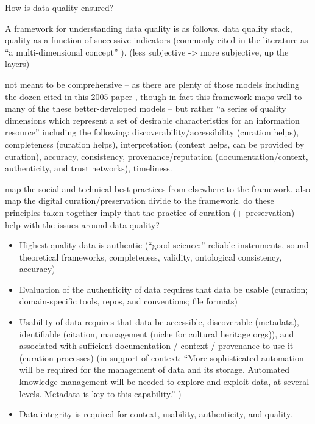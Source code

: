 \documentclass{acm_proc_article-sp}
\begin{document}
How is data quality ensured?

A framework for understanding data quality is as follows.  data
quality stack, quality as a function of successive indicators
(commonly cited in the literature as ``a multi-dimensional concept''
\cite{knight:quality}). (less subjective -> more subjective, up the
layers)

not meant to be comprehensive -- as there are plenty of those models
including the dozen cited in this 2005 paper \cite{knight:quality},
though in fact this framework maps well to many of the these
better-developed models -- but rather ``a series of quality dimensions
which represent a set of desirable characteristics for an information
resource'' \cite{curry:community} including the following:
discoverability/accessibility (curation helps), completeness (curation
helps), interpretation (context helps, can be provided by curation),
accuracy, consistency, provenance/reputation (documentation/context,
authenticity, and trust networks), timeliness.

map the social and technical best practices from elsewhere to the
framework. also map the digital curation/preservation divide to the
framework. do these principles taken together imply that the practice
of curation (+ preservation) help with the issues around data quality?

\begin{itemize}
\item Highest quality data is authentic (``good science:'' reliable
  instruments, sound theoretical frameworks, completeness, validity,
  ontological consistency, accuracy)
\item Evaluation of the authenticity of data requires that data be usable
  (curation; domain-specific tools, repos, and conventions; file formats)
\item Usability of data requires that data be accessible, discoverable
  (metadata), identifiable (citation, management (niche for cultural
  heritage orgs)), and associated with sufficient documentation /
  context / provenance to use it (curation processes) (in support of
  context: ``More sophisticated automation will be required for the
  management of data and its storage. Automated knowledge management
  will be needed to explore and exploit data, at several
  levels. Metadata is key to this capability.'' \cite{jisc:deluge})
\item Data integrity is required for context, usability, authenticity, and
  quality.
\end{itemize}
\end{document}
